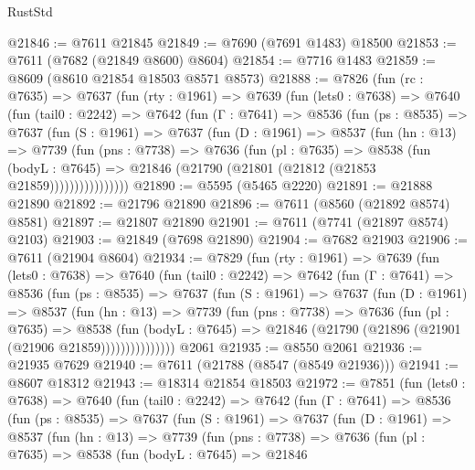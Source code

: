 \begin{lexlean}{RustStd}
\begin{coremodule}
{\begin{coremodule}
{{{{{{{{{{{{{{{{{{{{{{{{{{{{{{{{{{@21846 := @7611 @21845
@21849 := @7690 (@7691 @1483) @18500
@21853 := @7611 (@7682 (@21849 @8600) @8604)
@21854 := @7716 @1483
@21859 := @8609 (@8610 @21854 @18503 @8571 @8573)
@21888 := @7826
    (fun (rc : @7635) =>
    @7637
      (fun (rty : @1961) =>
      @7639
        (fun (lets0 : @7638) =>
        @7640
          (fun (tail0 : @2242) =>
          @7642
            (fun (Γ : @7641) =>
            @8536
              (fun (ps : @8535) =>
              @7637
                (fun (S : @1961) =>
                @7637
                  (fun (D : @1961) =>
                  @8537
                    (fun (hn : @13) =>
                    @7739
                      (fun (pns : @7738) =>
                      @7636
                        (fun (pl : @7635) =>
                        @8538
                          (fun (bodyL : @7645) =>
                          @21846 (@21790 (@21801 (@21812 (@21853 @21859))))))))))))))))
@21890 := @5595 (@5465 @2220)
@21891 := @21888 @21890
@21892 := @21796 @21890
@21896 := @7611 (@8560 (@21892 @8574) @8581)
@21897 := @21807 @21890
@21901 := @7611 (@7741 (@21897 @8574) @2103)
@21903 := @21849 (@7698 @21890)
@21904 := @7682 @21903
@21906 := @7611 (@21904 @8604)
@21934 := @7829
    (fun (rty : @1961) =>
    @7639
      (fun (lets0 : @7638) =>
      @7640
        (fun (tail0 : @2242) =>
        @7642
          (fun (Γ : @7641) =>
          @8536
            (fun (ps : @8535) =>
            @7637
              (fun (S : @1961) =>
              @7637
                (fun (D : @1961) =>
                @8537
                  (fun (hn : @13) =>
                  @7739
                    (fun (pns : @7738) =>
                    @7636
                      (fun (pl : @7635) =>
                      @8538
                        (fun (bodyL : @7645) =>
                        @21846 (@21790 (@21896 (@21901 (@21906 @21859)))))))))))))))
    @2061
@21935 := @8550 @2061
@21936 := @21935 @7629
@21940 := @7611 (@21788 (@8547 (@8549 @21936)))
@21941 := @8607 @18312
@21943 := @18314 @21854 @18503
@21972 := @7851
    (fun (lets0 : @7638) =>
    @7640
      (fun (tail0 : @2242) =>
      @7642
        (fun (Γ : @7641) =>
        @8536
          (fun (ps : @8535) =>
          @7637
            (fun (S : @1961) =>
            @7637
              (fun (D : @1961) =>
              @8537
                (fun (hn : @13) =>
                @7739
                  (fun (pns : @7738) =>
                  @7636
                    (fun (pl : @7635) =>
                    @8538
                      (fun (bodyL : @7645) =>
                      @21846
}}}}}}}}}}}}}}}}}}}}}}}}}}}}}}}}}}
\end{coremodule}}
\end{coremodule}
\end{lexlean}
